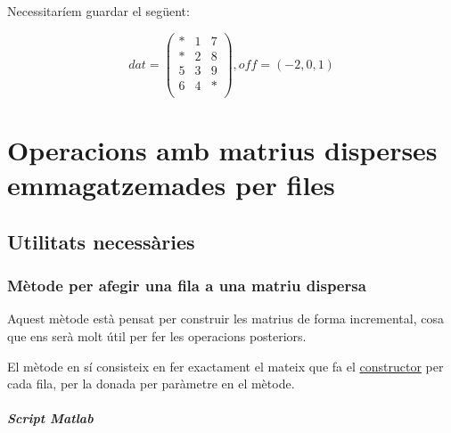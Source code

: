\documentclass[11pt,a4paper,twoside]{report}
\begin{document}
    Necessitaríem guardar el següent:
     
      \[ dat = 
	 	\begin{pmatrix}
  		  	*	&	1	& 7	\\
  		  	*	&	2	&	8	\\
   		 	5	&	3	&	9	\\
    		6	&	4	&	*	\\
    \end{pmatrix} , off = (-2, 0, 1)    
     \] 
  
  \chapter{Operacions amb matrius disperses emmagatzemades per files}
  
  \section{Utilitats necessàries}
  
  \subsection{Mètode per afegir una fila a una matriu dispersa}
  
  Aquest mètode està pensat per construir les matrius de forma incremental, cosa que ens serà molt útil per fer les operacions posteriors.
  
  El mètode en sí consisteix en fer exactament el mateix que fa el \hyperref[sec:Constructor]{constructor} per cada fila, per la donada per paràmetre en el mètode. 
  
  \paragraph*{Script Matlab} \mbox{} \\
	
	
  
  
  
  
  
  



  
\end{document}
